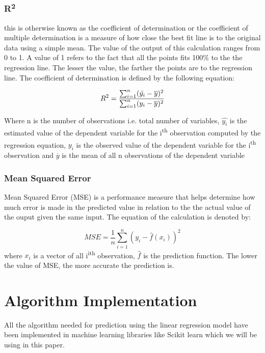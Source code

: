 \documentclass[conference]{IEEEtran}
\begin{document}
\subsubsection{R\textsuperscript{2}}
this is otherwise known as the coefficient of determination or the coefficient of multiple determination is a measure of how close the best fit line is to the original data using a simple mean. The value of the output of this calculation ranges from 0 to 1\cite{DAE79009}. A value of 1 refers to the fact that all the points fits 100$\%$ to the the regression line. The lesser the value, the farther the points are to the regression line. The coefficient of determination is defined by the following equation:

	\begin{equation}
		R\textsuperscript{2} = \label{three}\frac{\sum_{i=1}^{n}(\hat{y_i}-\overline{y})^2}{\sum_{i=1}^{n}(y_i-\overline{y})^2}
	\end{equation}
	
	Where n is the number of observations i.e. total number of variables, $\hat{y_i}$ is the estimated value of the dependent variable for the i\textsuperscript{th} observation computed by the regression equation, $y_i$ is the observed value of the dependent variable for the i\textsuperscript{th} observation and $\overline{y}$ is the mean of all n observations of the dependent variable \cite{DAE79009}

\subsubsection{Mean Squared Error}
Mean Squared Error (MSE) is a performance measure that helps determine how much error is made in the predicted value in relation to the the actual value of the ouput given the same input. The equation of the calculation is denoted by:

	\begin{equation}
		MSE = \label{four}\frac{1}{n}\sum_{i=1}^{n}(y_i-\hat{f}(x_i))^2
	\end{equation}
	where $x_i$ is a vector of all i\textsuperscript{ith} observation, $\hat{f}$ is the prediction function. The lower the value of MSE, the more accurate the prediction is.
\section{Algorithm Implementation}
All the algorithm needed  for prediction using the linear regression model have been implemented in machine learning libraries like Scikit learn which we will be using in this paper.
\end{document}
